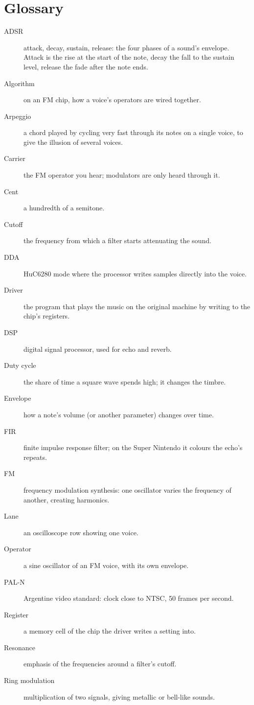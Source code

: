\chapter{Glossary}
\begin{description}
  \item[ADSR] attack, decay, sustain, release: the four phases of a sound's envelope. Attack is the rise at the start
        of the note, decay the fall to the sustain level, release the fade after the note ends.
  \item[Algorithm] on an FM chip, how a voice's operators are wired together.
  \item[Arpeggio] a chord played by cycling very fast through its notes on a single voice, to give the illusion of
        several voices.
  \item[Carrier] the FM operator you hear; modulators are only heard through it.
  \item[Cent] a hundredth of a semitone.
  \item[Cutoff] the frequency from which a filter starts attenuating the sound.
  \item[DDA] HuC6280 mode where the processor writes samples directly into the voice.
  \item[Driver] the program that plays the music on the original machine by writing to the chip's registers.
  \item[DSP] digital signal processor, used for echo and reverb.
  \item[Duty cycle] the share of time a square wave spends high; it changes the timbre.
  \item[Envelope] how a note's volume (or another parameter) changes over time.
  \item[FIR] finite impulse response filter; on the Super Nintendo it colours the echo's repeats.
  \item[FM] frequency modulation synthesis: one oscillator varies the frequency of another, creating harmonics.
  \item[Lane] an oscilloscope row showing one voice.
  \item[Operator] a sine oscillator of an FM voice, with its own envelope.
  \item[PAL-N] Argentine video standard: clock close to NTSC, 50 frames per second.
  \item[Register] a memory cell of the chip the driver writes a setting into.
  \item[Resonance] emphasis of the frequencies around a filter's cutoff.
  \item[Ring modulation] multiplication of two signals, giving metallic or bell-like sounds.

\end{description}
